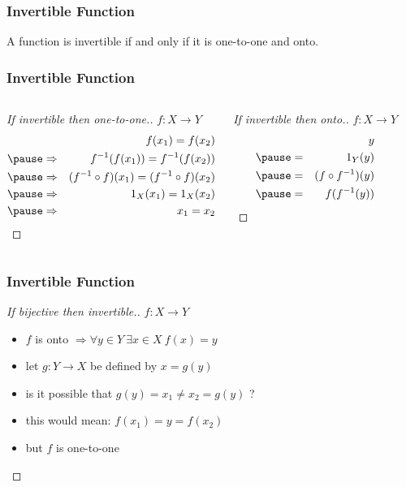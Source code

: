 \documentclass[dvipsnames]{beamer}
\begin{document}
\begin{frame}
  \frametitle{Invertible Function}

  \begin{theorem}
    A function is invertible if and only if it is one-to-one and onto.
  \end{theorem}
\end{frame}

\begin{frame}
  \frametitle{Invertible Function}

  \begin{columns}[t]
    \begin{proof}[If invertible then one-to-one.]
      $f: X \rightarrow Y$
      \begin{eqnarray*}
        &             & f(x_1) = f(x_2)\\\pause
        & \Rightarrow & f^{-1}(f(x_1)) = f^{-1}(f(x_2))\\\pause
        & \Rightarrow & (f^{-1} \circ f) (x_1) = (f^{-1} \circ f) (x_2)\\\pause
        & \Rightarrow & 1_X (x_1) = 1_X (x_2)\\\pause
        & \Rightarrow & x_1 = x_2
      \end{eqnarray*}
    \end{proof}

    \pause
    \begin{proof}[If invertible then onto.]
      $f: X \rightarrow Y$
      \begin{eqnarray*}
        &   & y\\\pause
        & = & 1_Y (y)\\\pause
        & = & (f \circ f^{-1}) (y)\\\pause
        & = & f(f^{-1} (y))
      \end{eqnarray*}
    \end{proof}
  \end{columns}
\end{frame}

\begin{frame}
  \frametitle{Invertible Function}

  \begin{proof}[If bijective then invertible.]
    $f: X \rightarrow Y$
    \begin{itemize}
      \item $f$ is onto $\Rightarrow \forall y \in Y~\exists x \in X~f(x)=y$
      \item let $g: Y \rightarrow X$ be defined by $x=g(y)$

      \pause
      \medskip
      \item is it possible that $g(y) = x_1 \neq x_2 = g(y)$ ?

      \pause
      \item this would mean: $f(x_1) = y = f(x_2)$
      \item but $f$ is one-to-one
    \end{itemize}
  \end{proof}
\end{frame}
\end{document}
